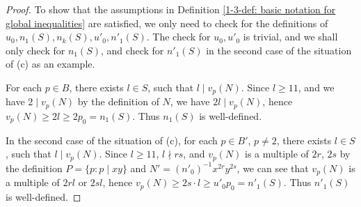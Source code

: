\documentclass[a4paper, 12pt]{article}
\numberwithin{equation}{section}
\theoremstyle{definition}
\begin{document}
\begin{proof}
To show that the assumptions in Definition \ref{1-3-def: basic notation for global inequalities} are satisfied, we only need to check for the definitions of $u_0, n_1(S), n_k(S), u'_0, n'_1(S)$. 
The check for $u_0, u'_0$ is trivial, and we shall only check for $n_1(S)$, and check for $n'_1(S)$ in the second case of the situation of (c) as an example.

For each $p\in B$, there exists $l\in S$, such that $l\mid v_p(N)$. Since $l\ge 11$, and we have $2\mid v_p(N)$ by the definition of $N$, we have $2l \mid v_p(N)$, hence $v_p(N) \ge 2l \ge 2p_0 = n_1(S)$. Thus $n_1(S)$ is well-defined.

In the second case of the situation of (c), for each $p\in B'$, $p\neq 2$, there exists $l\in S$, such that $l\mid v_p(N)$. 
Since $l\ge 11$, $l\nmid rs$, and $v_p(N)$ is a multiple of $2r$, $2s$ by the definition $P = \{p: p\mid xy\}$ and $N' = (n'_0)^{-1} x^{2r} y^{2s}$, we can see that $v_p(N)$ is a multiple of $2rl$ or $2sl$, hence $v_p(N) \ge 2s \cdot l \ge u'_0 p_0 = n'_1(S)$. Thus $n'_1(S)$ is well-defined.
\end{proof}
\end{document}
